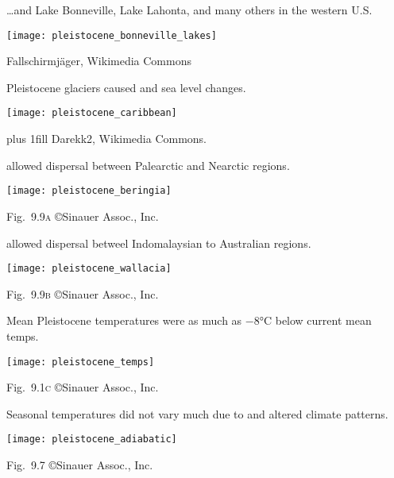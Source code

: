 \documentclass[t]{beamer}
\begin{document}
\begin{frame}{\dots and Lake Bonneville, Lake Lahonta, and many others in the western U.S.}

	\vspace*{-0.5\baselineskip}
	
	{\centering
		\texttt{[image: pleistocene\_bonneville\_lakes]}\par
	}

	\vfilll
	
	\hfill \tiny Fallschirmjäger, Wikimedia Commons 
\end{frame}

\begin{frame}{Pleistocene glaciers caused  and  sea level changes.}
	\vspace{-\baselineskip}
	\begin{center}
		\texttt{[image: pleistocene\_caribbean]}
	\end{center}
	\vskip0pt plus 1fill
	\hfill\tiny Darekk2, Wikimedia Commons.
\end{frame}

\begin{frame}{ allowed dispersal between Palearctic and Nearctic regions.}
		
	\texttt{[image: pleistocene\_beringia]}
	
	\vfilll
	
	\hfill \tiny Fig.~9.9\textsc{a} \copyright Sinauer Assoc., Inc.	
\end{frame}

\begin{frame}{ allowed dispersal betweel Indomalaysian to Australian regions.}

	\vspace{-0.5\baselineskip}

	{\centering
		\texttt{[image: pleistocene\_wallacia]}\par
	}

	\vfilll

	\hfill \tiny Fig.~9.9\textsc{b} \copyright Sinauer Assoc., Inc.
\end{frame}
%
\begin{frame}{Mean Pleistocene temperatures were as much as $-$8°C below current mean temps.}

	\texttt{[image: pleistocene\_temps]}

	\vfilll
	
	\hfill \tiny Fig.~9.1\textsc{c} \copyright Sinauer Assoc., Inc.
	
\end{frame}
%
\begin{frame}{Seasonal temperatures did not vary much due to  and altered climate patterns.}

	\texttt{[image: pleistocene\_adiabatic]}

	\hfill \tiny Fig.~9.7 \copyright Sinauer Assoc., Inc.
	
\end{frame}
\end{document}
